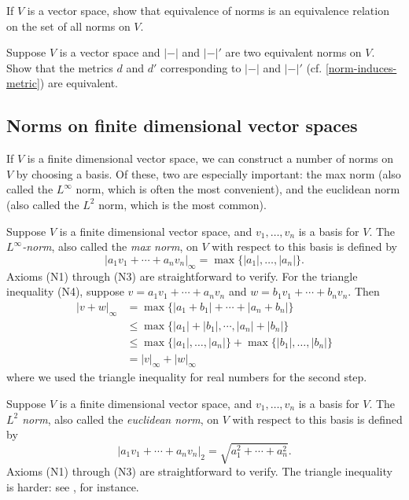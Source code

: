 \begin{exercise}
	If $V$ is a vector space, show that equivalence of norms is an equivalence relation on the set of all norms on $V$. 
\end{exercise}

\begin{exercise} \label{equivalent-norm-equivalent-metric}
	Suppose $V$ is a vector space and $|-|$ and $|-|'$ are two equivalent norms on $V$. Show that the metrics $d$ and $d'$ corresponding to $|-|$ and $|-|'$ (cf. \cref{norm-induces-metric}) are equivalent. 
\end{exercise}

\subsection{Norms on finite dimensional vector spaces}

If $V$ is a finite dimensional vector space, we can construct a number of norms on $V$ by choosing a basis. Of these, two are especially important: the max norm (also called the $L^\infty$ norm, which is often the most convenient), and the euclidean norm (also called the $L^2$ norm, which is the most common). 

\begin{example} \label{max-norm}  
	Suppose $V$ is a finite dimensional vector space, and $v_1, \dotsc, v_n$ is a basis for $V$. The \emph{$L^\infty$-norm}, also called the \emph{max norm}, on $V$ with respect to this basis is defined by
	\[ |a_1v_1 + \dotsb + a_n v_n|_\infty = \max \{ |a_1|, \dotsc, |a_n| \}. \]
	Axioms (N1) through (N3) are straightforward to verify. For the triangle inequality (N4), suppose $v = a_1 v_1 + \dotsb + a_n v_n$ and $w = b_1 v_1 + \dotsb +  b_n v_n$. Then
	\[ \begin{aligned} |v +  w|_\infty &= \max\{ |a_1 + b_1| + \dotsb + |a_n + b_n|  \} \\
	&\leq \max\{ |a_1| + |b_1|, \dotsb, |a_n| + |b_n| \} \\
	&\leq \max\{ |a_1|, \dotsc, |a_n|\} + \max\{|b_1|, \dotsc,  |b_n| \} \\
	&= |v|_\infty +  |w|_\infty \end{aligned} \]
	where we used the triangle inequality for real numbers for the second step. 
\end{example}

\begin{example} \label{l2-norm} 
	Suppose $V$ is a finite dimensional vector space, and $v_1, \dotsc, v_n$ is a basis for $V$. The \emph{$L^2$ norm}, also called the \emph{euclidean norm}, on $V$ with respect to this basis is defined by
	\[ |a_1v_1 + \dotsb + a_n v_n|_2 = \sqrt{a_1^2 + \dotsb + a_n^2}. \]
	Axioms (N1) through (N3) are straightforward to verify. The triangle inequality is harder: see \cite[theorem 6.2]{protter-morrey}, for instance.  
\end{example}

